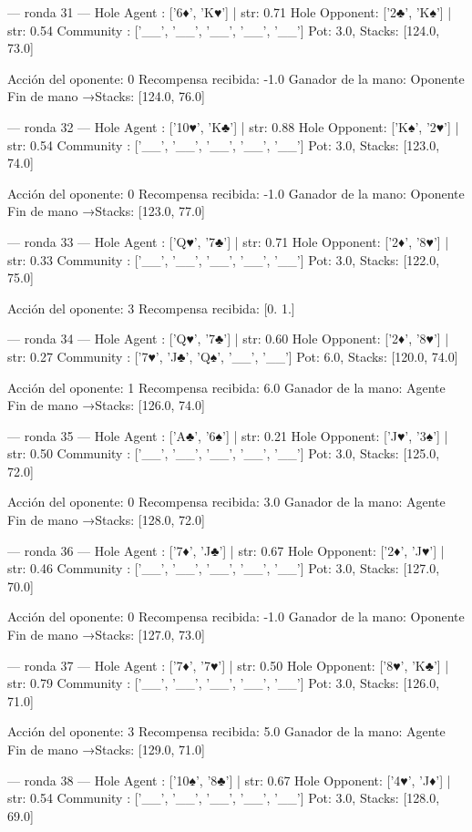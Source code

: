 --- ronda 31 ---
Hole Agent : ['6♦', 'K♥'] | str: 0.71
Hole Opponent: ['2♣', 'K♠'] | str: 0.54
Community  : ['__', '__', '__', '__', '__']
Pot: 3.0, Stacks: [124.0, 73.0]

Acción del oponente: 0
Recompensa recibida: -1.0
Ganador de la mano: Oponente
Fin de mano →Stacks: [124.0, 76.0]


--- ronda 32 ---
Hole Agent : ['10♥', 'K♣'] | str: 0.88
Hole Opponent: ['K♠', '2♥'] | str: 0.54
Community  : ['__', '__', '__', '__', '__']
Pot: 3.0, Stacks: [123.0, 74.0]

Acción del oponente: 0
Recompensa recibida: -1.0
Ganador de la mano: Oponente
Fin de mano →Stacks: [123.0, 77.0]


--- ronda 33 ---
Hole Agent : ['Q♥', '7♣'] | str: 0.71
Hole Opponent: ['2♦', '8♥'] | str: 0.33
Community  : ['__', '__', '__', '__', '__']
Pot: 3.0, Stacks: [122.0, 75.0]

Acción del oponente: 3
Recompensa recibida: [0. 1.]

--- ronda 34 ---
Hole Agent : ['Q♥', '7♣'] | str: 0.60
Hole Opponent: ['2♦', '8♥'] | str: 0.27
Community  : ['7♥', 'J♣', 'Q♠', '__', '__']
Pot: 6.0, Stacks: [120.0, 74.0]

Acción del oponente: 1
Recompensa recibida: 6.0
Ganador de la mano: Agente
Fin de mano →Stacks: [126.0, 74.0]


--- ronda 35 ---
Hole Agent : ['A♣', '6♠'] | str: 0.21
Hole Opponent: ['J♥', '3♠'] | str: 0.50
Community  : ['__', '__', '__', '__', '__']
Pot: 3.0, Stacks: [125.0, 72.0]

Acción del oponente: 0
Recompensa recibida: 3.0
Ganador de la mano: Agente
Fin de mano →Stacks: [128.0, 72.0]


--- ronda 36 ---
Hole Agent : ['7♦', 'J♣'] | str: 0.67
Hole Opponent: ['2♦', 'J♥'] | str: 0.46
Community  : ['__', '__', '__', '__', '__']
Pot: 3.0, Stacks: [127.0, 70.0]

Acción del oponente: 0
Recompensa recibida: -1.0
Ganador de la mano: Oponente
Fin de mano →Stacks: [127.0, 73.0]


--- ronda 37 ---
Hole Agent : ['7♦', '7♥'] | str: 0.50
Hole Opponent: ['8♥', 'K♣'] | str: 0.79
Community  : ['__', '__', '__', '__', '__']
Pot: 3.0, Stacks: [126.0, 71.0]

Acción del oponente: 3
Recompensa recibida: 5.0
Ganador de la mano: Agente
Fin de mano →Stacks: [129.0, 71.0]


--- ronda 38 ---
Hole Agent : ['10♠', '8♣'] | str: 0.67
Hole Opponent: ['4♥', 'J♦'] | str: 0.54
Community  : ['__', '__', '__', '__', '__']
Pot: 3.0, Stacks: [128.0, 69.0]

